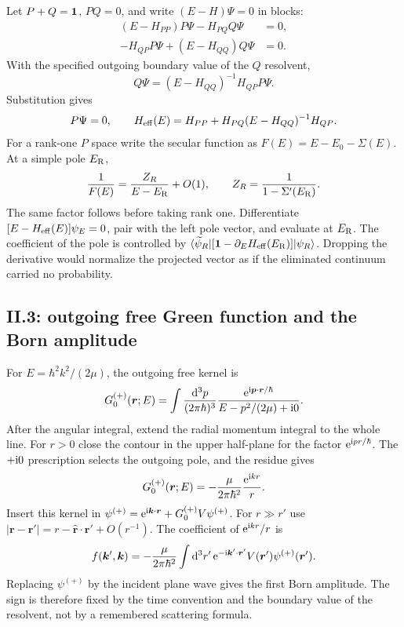 Let $P+Q=\mathbf{1}$, $PQ=0$, and write $(E-H)\Psi=0$ in blocks:
\begin{align}
  (E-H_{PP})P\Psi-H_{PQ}Q\Psi&=0,
  \\
  -H_{QP}P\Psi+(E-H_{QQ})Q\Psi&=0.
\end{align}
With the specified outgoing boundary value of the $Q$ resolvent,
\begin{equation}
  Q\Psi=(E-H_{QQ})^{-1}H_{QP}P\Psi .
\end{equation}
Substitution gives
\begin{equation}
  [E-\vsub{H}{eff}(E)]P\Psi=0,
  \qquad
  \vsub{H}{eff}(E)=H_{PP}+H_{PQ}(E-H_{QQ})^{-1}H_{QP}.
\end{equation}
For a rank-one $P$ space write the secular function as
$F(E)=E-E_0-\Sigma(E)$.  At a simple pole $E_{\mathrm{R}}$,
\begin{equation}
  \frac{1}{F(E)}=
  \frac{Z_R}{E-E_{\mathrm{R}}}+O(1),
  \qquad
  Z_R=\frac{1}{1-\Sigma'(E_{\mathrm{R}})}.
\end{equation}
The same factor follows before taking rank one.  Differentiate
$[E-H_{\mathrm{eff}}(E)]\psi_E=0$, pair with the left pole vector, and evaluate at
$E_{\mathrm{R}}$.  The coefficient of the pole is controlled by
$\langle \widetilde\psi_R \rvert[\mathbf{1}-\partial_EH_{\mathrm{eff}}(E_{\mathrm{R}})]\lvert \psi_R \rangle$.
Dropping the derivative would normalize the projected vector as if the
eliminated continuum carried no probability.

\subsection*{II.3: outgoing free Green function and the Born amplitude}

For $E=\hbar^2k^2/(2\mu)$, the outgoing free kernel is
\begin{equation}
  G_0^{(+)}(\bm r;E)
  =\int\frac{\mathrm{d}^3p}{(2\pi\hbar)^3}
  \frac{\mathrm{e}^{\mathrm{i}\bm p\cdot\bm r/\hbar}}
  {E-p^2/(2\mu)+\mathrm{i}0}.
\end{equation}
After the angular integral, extend the radial momentum integral to the whole
line.  For $r>0$ close the contour in the upper half-plane for the factor
$\mathrm{e}^{\mathrm{i} pr/\hbar}$.  The $+\mathrm{i}0$ prescription selects the outgoing pole,
and the residue gives
\begin{equation}
  G_0^{(+)}(\bm r;E)
  =-\frac{\mu}{2\pi\hbar^2}\frac{\mathrm{e}^{\mathrm{i} kr}}{r}.
\end{equation}
Insert this kernel in
$\psi^{(+)}=\mathrm{e}^{\mathrm{i}\bm k\cdot\bm r}+G_0^{(+)}V\psi^{(+)}$.
For $r\gg r'$ use
$|\bm r-\bm r'|=r-\widehat{\bm r}\cdot\bm r'+O(r^{-1})$.
The coefficient of $\mathrm{e}^{\mathrm{i} kr}/r$ is
\begin{equation}
  f(\bm k',\bm k)
  =-\frac{\mu}{2\pi\hbar^2}
  \int\mathrm{d}^3r'\,
  \mathrm{e}^{-\mathrm{i}\bm k'\cdot\bm r'}V(\bm r')\psi^{(+)}(\bm r').
\end{equation}
Replacing $\psi^{(+)}$ by the incident plane wave gives the first Born
amplitude.  The sign is therefore fixed by the time convention and the
boundary value of the resolvent, not by a remembered scattering formula.

